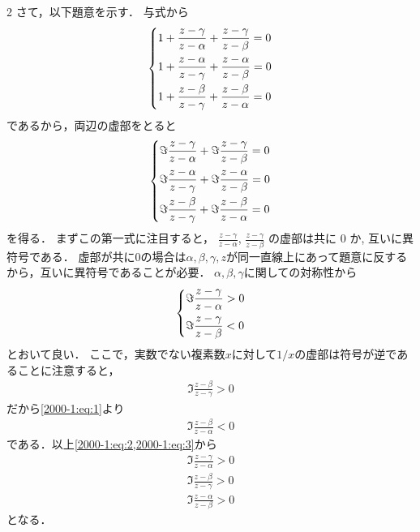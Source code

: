 \documentclass[../../../../main.tex]{subfiles}
\begin{document}
\begin{multicols}{2}
  さて，以下題意を示す．
  与式から
  \begin{align*}
    \begin{dcases}
      1 + \frac{z-\gamma}{z-\alpha} + \frac{z-\gamma}{z-\beta} = 0 \\
      1 + \frac{z-\alpha}{z-\gamma} + \frac{z-\alpha}{z-\beta} = 0 \\
      1 + \frac{z-\beta}{z-\gamma} + \frac{z-\beta}{z-\alpha}  = 0
    \end{dcases}
  \end{align*}
  であるから，両辺の虚部をとると
  \begin{align}
    \begin{dcases}
      \Im \frac{z-\gamma}{z-\alpha} + \Im \frac{z-\gamma}{z-\beta} = 0 \\
      \Im \frac{z-\alpha}{z-\gamma} + \Im \frac{z-\alpha}{z-\beta} = 0 \\
      \Im \frac{z-\beta}{z-\gamma} +  \Im \frac{z-\beta}{z-\alpha}  = 0
    \end{dcases} \label{2000-1:eq:1}
  \end{align}
  を得る．
  まずこの第一式に注目すると，
  $\frac{z-\gamma}{z-\alpha}$, $\frac{z-\gamma}{z-\beta}$ の虚部は共に $0$ か, 互いに異符号である．
  虚部が共に$0$の場合は$\alpha,\beta,\gamma,z$が同一直線上にあって題意に反するから，互いに異符号であることが必要．
  $\alpha,\beta,\gamma$に関しての対称性から
  \begin{align}
    \begin{dcases}
      \Im \frac{z-\gamma}{z-\alpha} > 0 \\
      \Im \frac{z-\gamma}{z-\beta} < 0
    \end{dcases} \label{2000-1:eq:2}
  \end{align}
  とおいて良い．
  ここで，実数でない複素数$x$に対して$1/x$の虚部は符号が逆であることに注意すると，
  \begin{align*}
    \Im \frac{z-\beta}{z-\gamma} > 0
  \end{align*}
  だから\cref{2000-1:eq:1}より
  \begin{align}
    \Im \frac{z-\beta}{z-\alpha} < 0  \label{2000-1:eq:3}
  \end{align}
  である．以上\cref{2000-1:eq:2,2000-1:eq:3}から
  \begin{align*}
    \Im \frac{z-\gamma}{z-\alpha} > 0 \\
    \Im \frac{z-\beta}{z-\gamma} > 0  \\
    \Im \frac{z-\alpha}{z-\beta} > 0
  \end{align*}
  となる．


\end{multicols}
\end{document}
